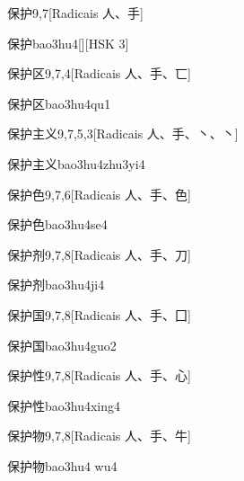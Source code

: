 \begin{entry}{保护}{9,7}[Radicais ⼈、⼿]
  \begin{phonetics}{保护}{bao3hu4}[][HSK 3]
  \end{phonetics}
\end{entry}

\begin{entry}{保护区}{9,7,4}[Radicais ⼈、⼿、⼖]
  \begin{phonetics}{保护区}{bao3hu4qu1}
  \end{phonetics}
\end{entry}

\begin{entry}{保护主义}{9,7,5,3}[Radicais ⼈、⼿、⼂、⼂]
  \begin{phonetics}{保护主义}{bao3hu4zhu3yi4}
  \end{phonetics}
\end{entry}

\begin{entry}{保护色}{9,7,6}[Radicais ⼈、⼿、⾊]
  \begin{phonetics}{保护色}{bao3hu4se4}
  \end{phonetics}
\end{entry}

\begin{entry}{保护剂}{9,7,8}[Radicais ⼈、⼿、⼑]
  \begin{phonetics}{保护剂}{bao3hu4ji4}
  \end{phonetics}
\end{entry}

\begin{entry}{保护国}{9,7,8}[Radicais ⼈、⼿、⼞]
  \begin{phonetics}{保护国}{bao3hu4guo2}
  \end{phonetics}
\end{entry}

\begin{entry}{保护性}{9,7,8}[Radicais ⼈、⼿、⼼]
  \begin{phonetics}{保护性}{bao3hu4xing4}
  \end{phonetics}
\end{entry}

\begin{entry}{保护物}{9,7,8}[Radicais ⼈、⼿、⽜]
  \begin{phonetics}{保护物}{bao3hu4 wu4}
  \end{phonetics}
\end{entry}

